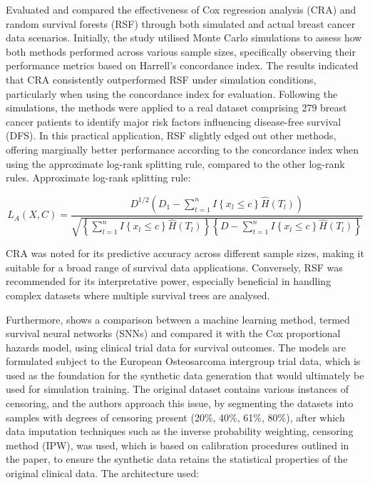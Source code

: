 \noindent \parencite{kurt_omurlu_comparisons_2009} Evaluated and compared the effectiveness of Cox regression analysis (CRA) and random survival forests (RSF) through both simulated and actual breast cancer data scenarios. Initially, the study utilised Monte Carlo simulations to assess how both methods performed across various sample sizes, specifically observing their performance metrics based on Harrell's concordance index. The results indicated that CRA consistently outperformed RSF under simulation conditions, particularly when using the concordance index for evaluation. Following the simulations, the methods were applied to a real dataset comprising 279 breast cancer patients to identify major risk factors influencing disease-free survival (DFS). In this practical application, RSF slightly edged out other methods, offering marginally better performance according to the concordance index when using the approximate log-rank splitting rule, compared to the other log-rank rules. Approximate log-rank splitting rule:

\begin{equation} \label{eq:logrankapprox}L_{A}(X,C) = \frac{D^{1/2}(D_{1} - \sum_{t=1}^{n} I\left\{ x_{l} \le c\right\}\hat{H}(T_{l}))}{\sqrt{\left\{ \sum_{l=1}^{n} I\left\{ x_{l} \le c\right\}\hat{H}(T_{l})\right\}\left\{D-\sum_{t=1}^{n}I\left\{ x_{l} \le c\right\}\hat{H}(T_{l})\right\}}}\end{equation}

\noindent \parencite{kurt_omurlu_comparisons_2009} CRA was noted for its predictive accuracy across different sample sizes, making it suitable for a broad range of survival data applications. Conversely, RSF was recommended for its interpretative power, especially beneficial in handling complex datasets where multiple survival trees are analysed.
\\
\par \noindent Furthermore, \parencite{kantidakis_simulation_2021} shows a comparison between a machine learning method, termed survival neural networks (SNNs) and compared it with the Cox proportional hazards model, using clinical trial data for survival outcomes. The models are formulated subject to the European Osteosarcoma intergroup trial data, which is used as the foundation for the synthetic data generation that would ultimately be used for simulation training. The original dataset contains various instances of censoring, and the authors approach this issue, by segmenting the datasets into samples with degrees of censoring present (20\%, 40\%, 61\%, 80\%), after which data imputation techniques such as the inverse probability weighting, censoring method (IPW), was used, which is based on calibration procedures outlined in the paper, to ensure the synthetic data retains the statistical properties of the original clinical data. The architecture used: 


